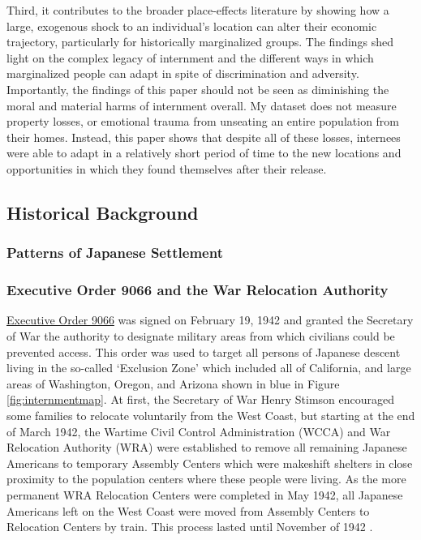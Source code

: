 \documentclass[12pt]{article}
\begin{document}
Third, it contributes to the broader place-effects literature
by showing how a large, exogenous shock to an individual's location
can alter their economic trajectory,
particularly for historically marginalized groups.
The findings shed light on the complex legacy of internment
and the different ways in which marginalized people can adapt
in spite of discrimination and adversity.
Importantly, the findings of this paper should not be seen
as diminishing the moral and material harms of internment overall.
My dataset does not measure property losses,
or emotional trauma from unseating an entire population from their homes.
Instead, this paper shows that despite all of these losses,
internees were able to adapt in a relatively short period of time
to the new locations and opportunities
in which they found themselves after their release.
\subsection{Historical Background}
\label{sec:orge28ed0c}

\subsubsection{Patterns of Japanese Settlement}
\label{sec:org729d912}

\subsubsection{Executive Order 9066 and the War Relocation Authority}
\label{sec:org54f0141}
\href{https://www.archives.gov/milestone-documents/executive-order-9066}{Executive Order 9066}
was signed on February 19, 1942 and granted the Secretary of War the authority
to designate military areas from which civilians could be prevented access. This
order was used to target all persons of Japanese descent living in the so-called
`Exclusion Zone' which included all of California, and large areas of
Washington, Oregon, and Arizona shown in blue in Figure \ref{fig:internmentmap}.
At first, the Secretary of War Henry Stimson encouraged some families
to relocate voluntarily from the West Coast,
but starting at the end of March 1942,
the Wartime Civil Control Administration (WCCA) and War Relocation Authority (WRA)
were established to remove all remaining Japanese Americans to temporary
Assembly Centers which were makeshift shelters in close proximity to the
population centers where these people were living. As the more permanent WRA
Relocation Centers were completed in May 1942, all Japanese Americans left
on the West Coast were moved from Assembly Centers to Relocation Centers by
train. This process lasted until November of 1942
\citep{commissiononwartimerelocationPersonalJusticeDenied1983,denshoencyclopediacontributorsResettlementDenshoEncyclopedia2020}.
\end{document}
